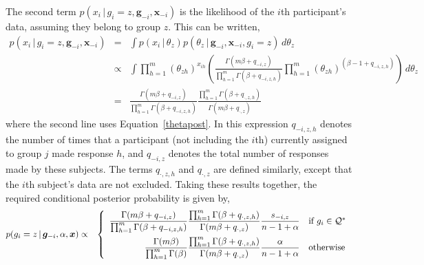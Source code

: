 \documentclass[authoryear]{elsarticle}
\newcommand{\condon}{\,|\,}
\newcommand{\vctr}[1]{\bm{#1}}
\begin{document}
The second term $p(x_i \condon g_i=z, \vctr{g}_{-i}, \vctr{x}_{-i})$ is the
likelihood of the $i$th participant's data, assuming they belong to group $z$.
This can be written,
\begin{eqnarray*}
        p(x_i \condon g_i=z, \vctr{g}_{-i}, \vctr{x}_{-i}) &=&
        \int p(x_i \condon \theta_z) p(\theta_z \condon \vctr{g}_{-i},\vctr{x}_{-i}, g_i=z)
        \, d\theta_z \\ & \propto & \int \prod_{h=1}^m (\theta_{zh})^{x_{ih}} \left(
        \frac{\Gamma(m\beta + q_{-i,z})}{\prod_{h=1}^m \Gamma(\beta + q_{-i,z,h})}
        \prod_{h=1}^m (\theta_{zh})^{(\beta -1 + q_{-i,z,h})} \right) \, d\theta_z
        \\
        &=& \frac{\Gamma(m\beta + q_{-i,z})}{\prod_{h=1}^m \Gamma(\beta + q_{-i,z,h})}
        \frac{\prod_{h=1}^m \Gamma(\beta + q_{\cdot,z,h} )}{\Gamma(m\beta +  q_{\cdot,z})}
\end{eqnarray*}
where the second line uses Equation~\ref{thetapost}. In this expression
 $q_{-i,z,h}$ denotes the number of times that a
participant (not including the $i$th) currently assigned to group $j$ made
response $h$, and $q_{-i,z}$ denotes the total number of responses made by
these subjects. The terms $q_{\cdot,z,h}$ and $q_{\cdot,z}$ are
defined similarly, except that the $i$th subject's data are not
excluded. Taking these results together, the required
 conditional posterior probability is given by,
\begin{eqnarray}
       p(g_i=z \condon \vctr{g}_{-i}, \alpha, \vctr{x})
        &\propto& \left\{
        \begin{array}{rl}
        \displaystyle \frac{\Gamma(m\beta +
        q_{-i,z})}{\prod_{h=1}^{m} \Gamma(\beta + q_{-i,z,h})} \frac{\prod_{h=1}^m \Gamma(\beta
        + q_{\cdot,z,h})}{\Gamma(m\beta +  q_{\cdot,z})} \frac{s_{-i,z}}{ n-1 +
        \alpha} & \mbox{if }  g_i \in \mathcal{Q}^* \vspace*{5pt} \\
        \displaystyle \frac{\Gamma(m\beta)}{\prod_{h=1}^{m} \Gamma(\beta)} \frac{\prod_{h=1}^m
        \Gamma(\beta + q_{\cdot,z,h})}{\Gamma(m\beta +  q_{\cdot,z})}
        \frac{\alpha}{n-1 + \alpha}
        & \mbox{otherwise}
        \end{array}\right.
        \label{oldgp}
\end{eqnarray}
\end{document}
